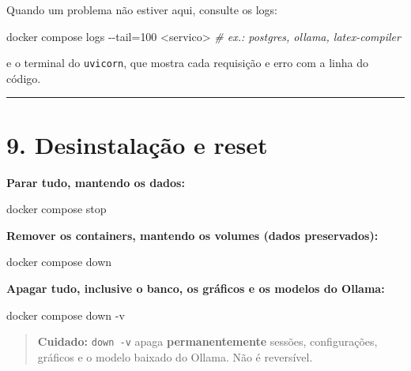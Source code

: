 \documentclass[
  brazilian,
  a4paper,12pt,oneside]{report}
\newenvironment{Shaded}{}{}
\newcommand{\CommentTok}[1]{\textcolor[rgb]{0.38,0.63,0.69}{\textit{#1}}}
\newcommand{\DecValTok}[1]{\textcolor[rgb]{0.25,0.63,0.44}{#1}}
\newcommand{\NormalTok}[1]{#1}
\newcommand{\OperatorTok}[1]{\textcolor[rgb]{0.40,0.40,0.40}{#1}}
\begin{document}
Quando um problema não estiver aqui, consulte os logs:

\begin{Shaded}
\begin{Highlighting}[]
\NormalTok{docker compose logs }\OperatorTok{{-}{-}}\NormalTok{tail}\OperatorTok{=}\DecValTok{100} \OperatorTok{\textless{}}\NormalTok{servico}\OperatorTok{\textgreater{}}      \CommentTok{\# ex.: postgres, ollama, latex{-}compiler}
\end{Highlighting}
\end{Shaded}

e o terminal do \texttt{uvicorn}, que mostra cada requisição e erro com
a linha do código.

\begin{center}\rule{0.5\linewidth}{0.5pt}\end{center}

\chapter{9. Desinstalação e reset}\label{desinstalauxe7uxe3o-e-reset}

\textbf{Parar tudo, mantendo os dados:}

\begin{Shaded}
\begin{Highlighting}[]
\NormalTok{docker compose stop}
\end{Highlighting}
\end{Shaded}

\textbf{Remover os containers, mantendo os volumes (dados preservados):}

\begin{Shaded}
\begin{Highlighting}[]
\NormalTok{docker compose down}
\end{Highlighting}
\end{Shaded}

\textbf{Apagar tudo, inclusive o banco, os gráficos e os modelos do
Ollama:}

\begin{Shaded}
\begin{Highlighting}[]
\NormalTok{docker compose down }\OperatorTok{{-}}\NormalTok{v}
\end{Highlighting}
\end{Shaded}

\begin{quote}
\textbf{Cuidado:} \texttt{down\ -}\allowbreak{}\texttt{v} apaga
\textbf{permanentemente} sessões, configurações, gráficos e o modelo
baixado do Ollama. Não é reversível.
\end{quote}
\end{document}
